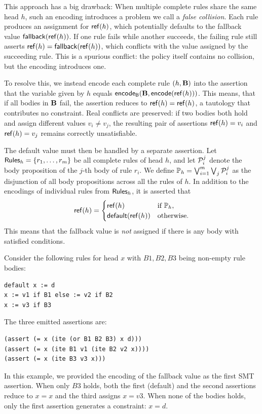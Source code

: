 This approach has a big drawback:
When multiple complete rules share the same head $h$, such an encoding introduces a problem we call a \emph{false collision}.
Each rule produces an assignment for $\mathsf{ref}(h)$, which potentially defaults to the fallback value $\mathsf{fallback}(\mathsf{ref}(h))$.
If one rule fails while another succeeds, the failing rule still asserts $\mathsf{ref}(h) = \mathsf{fallback}(\mathsf{ref}(h))$, which conflicts with the value assigned by the succeeding rule.
This is a spurious conflict: the policy itself contains no collision, but the encoding introduces one.

To resolve this, we instead encode each complete rule $(h,\mathbf{B})$ into the assertion that the variable given by $h$ equals $\mathsf{encode_{\tiny{B}}}(\mathbf{B},\mathsf{encode}(\mathsf{ref}(h)))$.
This means, that if all bodies in $\mathbf{B}$ fail, the assertion reduces to $\mathsf{ref}(h) = \mathsf{ref}(h)$, a tautology that contributes no constraint.
Real conflicts are preserved: if two bodies both hold and assign different values $v_i \neq v_j$, the resulting pair of assertions $\mathsf{ref}(h) = v_i$ and $\mathsf{ref}(h) = v_j$ remains correctly unsatisfiable.

The default value must then be handled by a separate assertion.
Let $\mathsf{Rules}_h = \{r_1, \dots, r_m\}$ be all complete rules of head $h$, and let $\mathcal{P}_i^j$ denote the body proposition of the $j$-th body of rule $r_i$.
We define $\mathbb{P}_h = \bigvee_{i=1}^{m} \bigvee_{j} \mathcal{P}_i^j$ as the disjunction of all body propositions across all the rules of $h$.
In addition to the encodings of individual rules from $\mathsf{Rules}_h$, it is asserted that
\[
  \mathsf{ref}(h) =
  \begin{cases}
    \mathsf{ref}(h) & \text{if } \mathbb{P}_h, \\
    \mathsf{default}(\mathsf{ref}(h))   & \text{otherwise.}
  \end{cases}
\]
This means that the fallback value is \emph{not} assigned if there is any body with satisfied conditions.

\begin{example}
  Consider the following rules for head $x$ with $B1,B2,B3$ being non-empty rule bodies:
\begin{lstlisting}[language=Rego]
default x := d
x := v1 if B1 else := v2 if B2
x := v3 if B3
\end{lstlisting}
  The three emitted assertions are:
\begin{lstlisting}[language=SMT,escapechar=|]
(assert (= x (ite (or B1 B2 B3) x d)))
(assert (= x (ite B1 v1 (ite B2 v2 x))))
(assert (= x (ite B3 v3 x)))
\end{lstlisting}
  In this example, we provided the encoding of the fallback value as the first SMT assertion.
  When only $B3$ holds, both the first (default) and the second assertions reduce to $x = x$ and the third assigns $x = v3$.
  When none of the bodies holds, only the first assertion generates a constraint: $x = d$.
\end{example}
